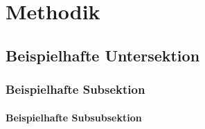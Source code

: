 \chapter{Methodik}
\lipsum[5-6] %

\section{Beispielhafte Untersektion}
\lipsum[1] %

\subsection{Beispielhafte Subsektion}
\lipsum[2] %

\subsubsection{Beispielhafte Subsubsektion}
\lipsum[3] %